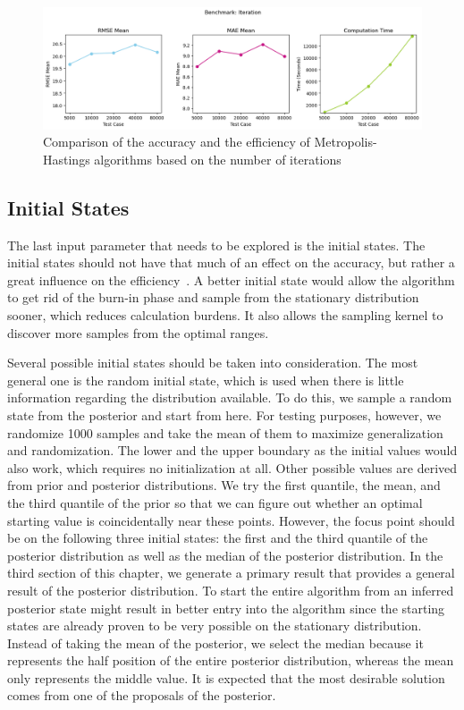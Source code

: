\begin{figure}[H]
    \centering
    \includegraphics[width=1\textwidth]{figures/basic_mh/benchmark/iteration.png}
    \captionsetup{width=.8\textwidth}
    \caption{Comparison of the accuracy and the efficiency of Metropolis-Hastings algorithms based on the number of iterations}
    \label{fig:enter-label}
\end{figure}


\subsection{Initial States}
The last input parameter that needs to be explored is the initial states. The initial states should not have that much of an effect on the accuracy, but rather a great influence on the efficiency~\cite{mcmc_practice}. A better initial state would allow the algorithm to get rid of the burn-in phase and sample from the stationary distribution sooner, which reduces calculation burdens. It also allows the sampling kernel to discover more samples from the optimal ranges.

Several possible initial states should be taken into consideration. The most general one is the random initial state, which is used when there is little information regarding the distribution available. To do this, we sample a random state from the posterior and start from here. For testing purposes, however, we randomize 1000 samples and take the mean of them to maximize generalization and randomization. The lower and the upper boundary as the initial values would also work, which requires no initialization at all. Other possible values are derived from prior and posterior distributions. We try the first quantile, the mean, and the third quantile of the prior so that we can figure out whether an optimal starting value is coincidentally near these points. However, the focus point should be on the following three initial states: the first and the third quantile of the posterior distribution as well as the median of the posterior distribution. In the third section of this chapter, we generate a primary result that provides a general result of the posterior distribution. To start the entire algorithm from an inferred posterior state might result in better entry into the algorithm since the starting states are already proven to be very possible on the stationary distribution. Instead of taking the mean of the posterior, we select the median because it represents the half position of the entire posterior distribution, whereas the mean only represents the middle value. It is expected that the most desirable solution comes from one of the proposals of the posterior.

